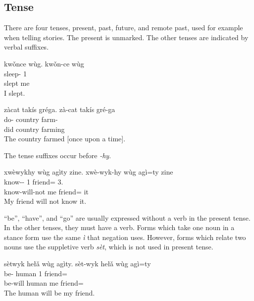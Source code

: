 \subsection{Tense}\label{subsec:tense}
There are four tenses, present, past, future, and remote past,
used for example when telling stories.
The present is unmarked.
The other tenses are indicated by verbal suffixes.

\begin{exe}
    \ex
    \glt
    kwǒnce wùg.
    \glll
    kwǒn-ce wùg \\
    sleep-\Pst{} 1\Sg{} \\
    slept me \\
    \glt
    I slept.
\end{exe}

\begin{exe}
    \ex
    \glt
    zàcat takís gréga.
    \glll
    zà-cat takís gré-ga \\
    do-\Hst{} country farm-\Ger{} \\
    did country farming \\
    \glt
    The country farmed [once upon a time].
\end{exe}



The tense suffixes occur before \textit{-hy}.
\begin{exe}
    \ex
    \glt
    xwèwykhy wùg agìty zine.
    \glll
    xwè-wyk-hy wùg agì=ty zine \\
    know-\Fut{}-\Neg{} 1\Sg{} friend=\Poss{} 3\Sg{}.\Inanim{} \\
    know-will-not me friend=\Poss{} it \\
    \glt
    My friend will not know it.
\end{exe}

``be'', ``have'', and ``go''
are usually expressed without a verb in the present tense.
In the other tenses, they must have a verb.
Forms which take one noun in a stance form use the same \textit{ì}
that negation uses.
However, forms which relate two nouns
use the suppletive verb \textit{sèt}, which is not used in present tense.

\begin{exe}
    \ex
    \glt
    sètwyk hełǎ wùg agìty.
    \glll
    sèt-wyk hełǎ wùg agì=ty \\
    be-\Fut{} human 1\Sg{} friend=\Poss{} \\
    be-will human me friend=\Poss{} \\
    \glt
    The human will be my friend.
\end{exe}

